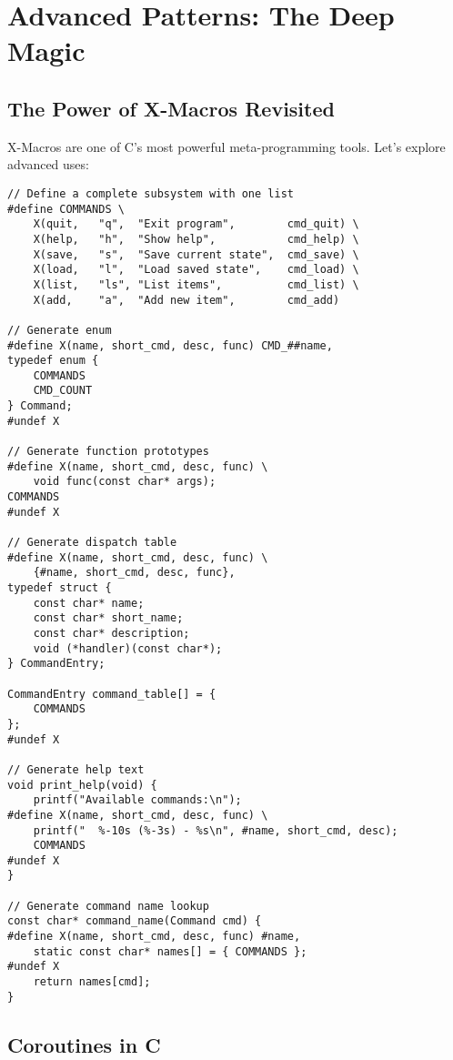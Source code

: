 \chapter{Advanced Patterns: The Deep Magic}

\section{The Power of X-Macros Revisited}

X-Macros are one of C's most powerful meta-programming tools. Let's explore advanced uses:

\begin{lstlisting}
// Define a complete subsystem with one list
#define COMMANDS \
    X(quit,   "q",  "Exit program",        cmd_quit) \
    X(help,   "h",  "Show help",           cmd_help) \
    X(save,   "s",  "Save current state",  cmd_save) \
    X(load,   "l",  "Load saved state",    cmd_load) \
    X(list,   "ls", "List items",          cmd_list) \
    X(add,    "a",  "Add new item",        cmd_add)

// Generate enum
#define X(name, short_cmd, desc, func) CMD_##name,
typedef enum {
    COMMANDS
    CMD_COUNT
} Command;
#undef X

// Generate function prototypes
#define X(name, short_cmd, desc, func) \
    void func(const char* args);
COMMANDS
#undef X

// Generate dispatch table
#define X(name, short_cmd, desc, func) \
    {#name, short_cmd, desc, func},
typedef struct {
    const char* name;
    const char* short_name;
    const char* description;
    void (*handler)(const char*);
} CommandEntry;

CommandEntry command_table[] = {
    COMMANDS
};
#undef X

// Generate help text
void print_help(void) {
    printf("Available commands:\n");
#define X(name, short_cmd, desc, func) \
    printf("  %-10s (%-3s) - %s\n", #name, short_cmd, desc);
    COMMANDS
#undef X
}

// Generate command name lookup
const char* command_name(Command cmd) {
#define X(name, short_cmd, desc, func) #name,
    static const char* names[] = { COMMANDS };
#undef X
    return names[cmd];
}
\end{lstlisting}

\section{Coroutines in C}

